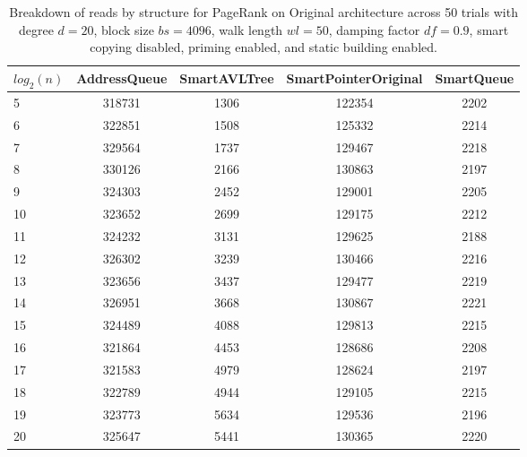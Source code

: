 \begin{table}[]
\centering
\begin{tabular}{|l|c|c|c|c|}
$log_2(n)$ & AddressQueue & SmartAVLTree & SmartPointerOriginal & SmartQueue \\ \hline
5 & 318731 & 1306 & 122354 & 2202 \\ \hline
6 & 322851 & 1508 & 125332 & 2214 \\ \hline
7 & 329564 & 1737 & 129467 & 2218 \\ \hline
8 & 330126 & 2166 & 130863 & 2197 \\ \hline
9 & 324303 & 2452 & 129001 & 2205 \\ \hline
10 & 323652 & 2699 & 129175 & 2212 \\ \hline
11 & 324232 & 3131 & 129625 & 2188 \\ \hline
12 & 326302 & 3239 & 130466 & 2216 \\ \hline
13 & 323656 & 3437 & 129477 & 2219 \\ \hline
14 & 326951 & 3668 & 130867 & 2221 \\ \hline
15 & 324489 & 4088 & 129813 & 2215 \\ \hline
16 & 321864 & 4453 & 128686 & 2208 \\ \hline
17 & 321583 & 4979 & 128624 & 2197 \\ \hline
18 & 322789 & 4944 & 129105 & 2215 \\ \hline
19 & 323773 & 5634 & 129536 & 2196 \\ \hline
20 & 325647 & 5441 & 130365 & 2220 \\ \hline
\end{tabular}
\caption{Breakdown of reads by structure for PageRank on Original architecture across 50 trials with degree $d=20$, block size $bs=4096$, walk length $wl=50$, damping factor $df=0.9$, smart copying disabled, priming enabled, and static building enabled.}
    \label{tab:reads_by_structure_pr_d20_bs4096_trials50_copiesfalse_primetrue_staticinsertiontrue_wl50_df0.9_ptoriginal_movefalse}
\end{table}

